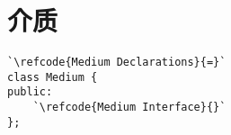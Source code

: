 \section{介质}\label{sec:介质}

\label{code:overview_Medium}
\begin{lstlisting}
`\refcode{Medium Declarations}{=}`
class Medium {
public:
    `\refcode{Medium Interface}{}`
};
\end{lstlisting}
